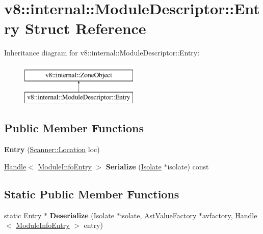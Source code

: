 \hypertarget{structv8_1_1internal_1_1ModuleDescriptor_1_1Entry}{}\section{v8\+:\+:internal\+:\+:Module\+Descriptor\+:\+:Entry Struct Reference}
\label{structv8_1_1internal_1_1ModuleDescriptor_1_1Entry}
Inheritance diagram for v8\+:\+:internal\+:\+:Module\+Descriptor\+:\+:Entry\+:\begin{figure}[H]
\begin{center}
\leavevmode
\includegraphics[height=2.000000cm]{structv8_1_1internal_1_1ModuleDescriptor_1_1Entry}
\end{center}
\end{figure}
\subsection*{Public Member Functions}
\begin{DoxyCompactItemize}
\item 
\mbox{\label{structv8_1_1internal_1_1ModuleDescriptor_1_1Entry_acf704f9f427a711a92e7f742e5891222}} 
{\bfseries Entry} (\mbox{\hyperlink{structv8_1_1internal_1_1Scanner_1_1Location}{Scanner\+::\+Location}} loc)
\item 
\mbox{\label{structv8_1_1internal_1_1ModuleDescriptor_1_1Entry_a146a2c367e7c8ff6a13cafffa03fa2ed}} 
\mbox{\hyperlink{classv8_1_1internal_1_1Handle}{Handle}}$<$ \mbox{\hyperlink{classv8_1_1internal_1_1ModuleInfoEntry}{Module\+Info\+Entry}} $>$ {\bfseries Serialize} (\mbox{\hyperlink{classv8_1_1internal_1_1Isolate}{Isolate}} $\ast$isolate) const
\end{DoxyCompactItemize}
\subsection*{Static Public Member Functions}
\begin{DoxyCompactItemize}
\item 
\mbox{\label{structv8_1_1internal_1_1ModuleDescriptor_1_1Entry_a34ca492dd901cecc1be308090ad4258c}} 
static \mbox{\hyperlink{structv8_1_1internal_1_1ModuleDescriptor_1_1Entry}{Entry}} $\ast$ {\bfseries Deserialize} (\mbox{\hyperlink{classv8_1_1internal_1_1Isolate}{Isolate}} $\ast$isolate, \mbox{\hyperlink{classv8_1_1internal_1_1AstValueFactory}{Ast\+Value\+Factory}} $\ast$avfactory, \mbox{\hyperlink{classv8_1_1internal_1_1Handle}{Handle}}$<$ \mbox{\hyperlink{classv8_1_1internal_1_1ModuleInfoEntry}{Module\+Info\+Entry}} $>$ entry)
\end{DoxyCompactItemize}
